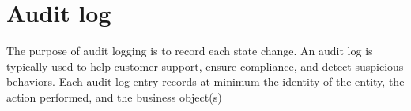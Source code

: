 



\section{Audit log}\label{sec:adtlog}

The purpose of audit logging is to record each state change. An audit log is typically used to help customer support, ensure compliance, and detect suspicious behaviors. Each audit log entry records at minimum the identity of the entity, the action performed, and the business object(s)~\citep{richardson2018microservices}


